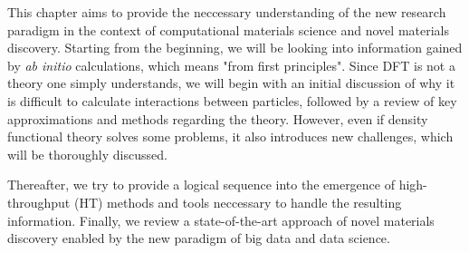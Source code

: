 This chapter aims to provide the neccessary understanding of the new research paradigm in the context of computational materials science and novel materials discovery. Starting from the beginning, we will be looking into information gained by \textit{ab initio} calculations, which means "from first principles". %
Since DFT is not a theory one simply understands, we will begin with an initial discussion of why it is difficult to calculate interactions between particles, followed by a review of key approximations and methods regarding the theory. However, even if density functional theory solves some problems, it also introduces new challenges, which will be thoroughly discussed.

Thereafter, we try to provide a logical sequence into the emergence of high-throughput (HT) methods and tools neccessary to handle the resulting information. Finally, we review a state-of-the-art approach of novel materials discovery enabled by the new paradigm of big data and data science.


